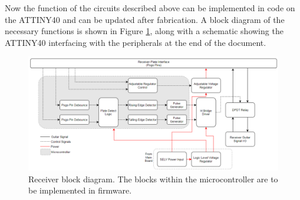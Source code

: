 \documentclass{article}
\begin{document}
		Now the function of the circuits described above can be implemented in code on the ATTINY40 and can be updated after fabrication.  A block diagram of the necessary functions is shown in Figure \ref{fig:MicroBlockDiagram}, along with a schematic showing the ATTINY40 interfacing with the peripherals at the end of the document.

		\begin{figure}
			\centering
			\includegraphics[width = \textwidth]{PR2Images/ReceiverBlockDiagramMCU.PNG}
			\caption{Receiver block diagram.  The blocks within the microcontroller are to be implemented in firmware.}
			\label{fig:MicroBlockDiagram}
		\end{figure}

	\color{black}



\end{document}
